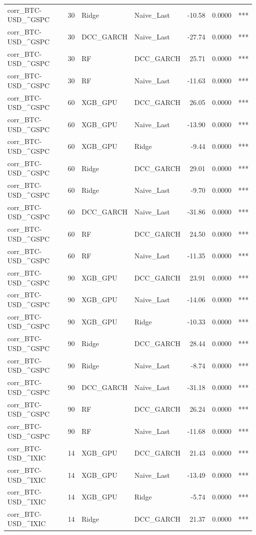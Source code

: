 \begin{table}[H]
\begin{tabular}{llllrrl}
corr_BTC-USD_^GSPC & 30 & Ridge & Naive_Last & -10.58 & 0.0000 & *** \\
corr_BTC-USD_^GSPC & 30 & DCC_GARCH & Naive_Last & -27.74 & 0.0000 & *** \\
corr_BTC-USD_^GSPC & 30 & RF & DCC_GARCH & 25.71 & 0.0000 & *** \\
corr_BTC-USD_^GSPC & 30 & RF & Naive_Last & -11.63 & 0.0000 & *** \\
corr_BTC-USD_^GSPC & 60 & XGB_GPU & DCC_GARCH & 26.05 & 0.0000 & *** \\
corr_BTC-USD_^GSPC & 60 & XGB_GPU & Naive_Last & -13.90 & 0.0000 & *** \\
corr_BTC-USD_^GSPC & 60 & XGB_GPU & Ridge & -9.44 & 0.0000 & *** \\
corr_BTC-USD_^GSPC & 60 & Ridge & DCC_GARCH & 29.01 & 0.0000 & *** \\
corr_BTC-USD_^GSPC & 60 & Ridge & Naive_Last & -9.70 & 0.0000 & *** \\
corr_BTC-USD_^GSPC & 60 & DCC_GARCH & Naive_Last & -31.86 & 0.0000 & *** \\
corr_BTC-USD_^GSPC & 60 & RF & DCC_GARCH & 24.50 & 0.0000 & *** \\
corr_BTC-USD_^GSPC & 60 & RF & Naive_Last & -11.35 & 0.0000 & *** \\
corr_BTC-USD_^GSPC & 90 & XGB_GPU & DCC_GARCH & 23.91 & 0.0000 & *** \\
corr_BTC-USD_^GSPC & 90 & XGB_GPU & Naive_Last & -14.06 & 0.0000 & *** \\
corr_BTC-USD_^GSPC & 90 & XGB_GPU & Ridge & -10.33 & 0.0000 & *** \\
corr_BTC-USD_^GSPC & 90 & Ridge & DCC_GARCH & 28.44 & 0.0000 & *** \\
corr_BTC-USD_^GSPC & 90 & Ridge & Naive_Last & -8.74 & 0.0000 & *** \\
corr_BTC-USD_^GSPC & 90 & DCC_GARCH & Naive_Last & -31.18 & 0.0000 & *** \\
corr_BTC-USD_^GSPC & 90 & RF & DCC_GARCH & 26.24 & 0.0000 & *** \\
corr_BTC-USD_^GSPC & 90 & RF & Naive_Last & -11.68 & 0.0000 & *** \\
corr_BTC-USD_^IXIC & 14 & XGB_GPU & DCC_GARCH & 21.43 & 0.0000 & *** \\
corr_BTC-USD_^IXIC & 14 & XGB_GPU & Naive_Last & -13.49 & 0.0000 & *** \\
corr_BTC-USD_^IXIC & 14 & XGB_GPU & Ridge & -5.74 & 0.0000 & *** \\
corr_BTC-USD_^IXIC & 14 & Ridge & DCC_GARCH & 21.37 & 0.0000 & *** \\

\end{tabular}
\end{table}

